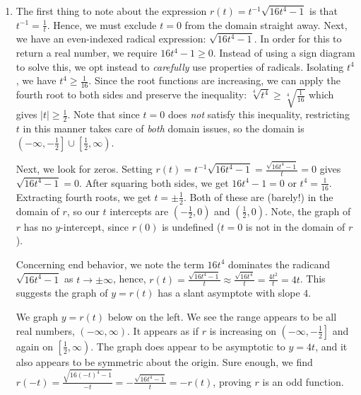 \begin{ex}
\begin{enumerate}
\begin{mfigure}
\caption{}
\label{fig:signdiagramnforyeqhxeqthreebysqrtetc}
\end{mfigure}

\item  The first thing to note about the expression  $r(t) = t^{-1} \sqrt{16t^4-1}$ is that $t^{-1} = \frac{1}{t}$.  Hence, we must exclude $t=0$ from the domain straight away. Next, we have an even-indexed radical expression: $\sqrt{16t^4-1}$.  In order for this to return a real number, we require  $16t^4-1 \geq 0$.  Instead of using a sign diagram to solve this, we opt instead to  \textit{carefully} use properties of radicals.  Isolating $t^4$, we have $t^4 \geq \frac{1}{16}$.  Since the root functions are increasing, we can apply the fourth root to both sides and preserve the inequality:  $\sqrt[4]{t^4} \geq \sqrt[4]{\frac{1}{16}}$ which gives $|t| \geq \frac{1}{2}$. Note that since $t =0$ does \textit{not} satisfy this inequality, restricting $t$ in this manner takes care of  \textit{both} domain issues, so the domain is  $\left(-\infty, -\frac{1}{2} \right] \cup \left[\frac{1}{2}, \infty \right)$. 

Next, we look for zeros.  Setting $r(t) = t^{-1} \sqrt{16t^4-1} = \frac{\sqrt{16t^4-1}}{t}=0$ gives $\sqrt{16t^4-1} = 0$.  After squaring both sides, we get $16t^4-1 = 0$ or $t^4 = \frac{1}{16}$.  Extracting fourth roots, we get $t = \pm \frac{1}{2}$. Both of these are (barely!) in the domain of $r$, so our $t$ intercepts are $\left( -\frac{1}{2}, 0\right)$ and $\left( \frac{1}{2}, 0\right)$.  Note, the graph of $r$ has no $y$-intercept, since $r(0)$ is undefined ($t=0$ is not in the domain of $r$).  

Concerning end behavior, we note the term $16t^4$ dominates the radicand $\sqrt{16t^4-1}$ as $t \rightarrow \pm \infty$,  hence, $r(t) = \frac{\sqrt{16t^4-1}}{t} \approx \frac{\sqrt{16t^4}}{t} = \frac{4t^2}{t} = 4t$.  This suggests the graph of $y = r(t)$ has a slant asymptote with slope $4$.  

We graph $y=r(t)$ below on the left.  We see the range appears to be all real numbers, $(-\infty, \infty)$.  It appears as if $r$ is increasing on $\left(-\infty, -\frac{1}{2} \right]$ and again on $\left[\frac{1}{2}, \infty \right)$.  The graph does appear to be asymptotic to $y = 4t$, and it also appears to be symmetric about the origin.  Sure enough, we find  $r(-t) = \frac{\sqrt{16(-t)^4-1}}{-t}  = - \frac{\sqrt{16t^4-1}}{t} = -r(t)$, proving $r$ is an odd function.


\end{enumerate}
\end{ex}
